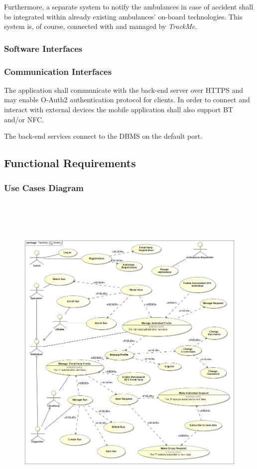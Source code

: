 \documentclass[a4paper]{article}
\begin{document}
        Furthermore, a separate system to notify the ambulances in case of accident shall be integrated within already existing ambulances' on-board technologies. This system is, of course, connected with and managed by \textit{TrackMe}.
        
        \subsubsection{Software Interfaces}

        \subsubsection{Communication Interfaces}
        The application shall communicate with the back-end server over HTTPS and may enable O-Auth2 authentication protocol for clients. In order to connect and interact with external devices the mobile application shall also support BT and/or NFC.
        
        The back-end services connect to the DBMS on the default port.

    \newpage
    \subsection{Functional Requirements}

        \subsubsection{Use Cases Diagram}
        \begin{figure}[!htpb]
    	\centering
    	\includegraphics[width=\textwidth,height=160mm]{images/UML/Model.jpg}
        \end{figure}
        \newpage
        
\end{document}
